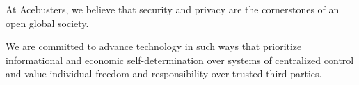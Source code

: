 At Acebusters, we believe that security and privacy are the cornerstones of an open global society.
 
We are committed to advance technology in such ways that prioritize informational and economic self-determination over systems of centralized control and value individual freedom and responsibility over trusted third parties.
